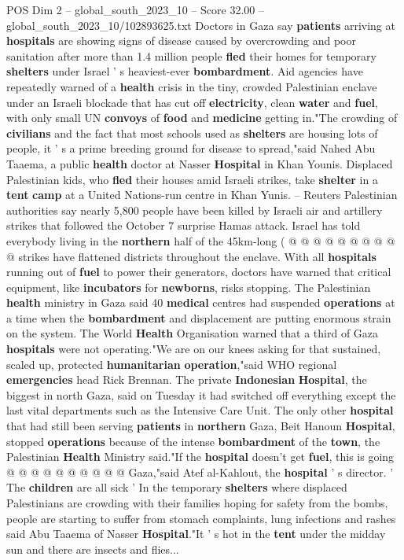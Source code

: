 \begin{textsample}{POS Dim 2 – global\_south\_2023\_10 – Score 32.00 – global\_south\_2023\_10/102893625.txt}  \label{ex:f2_pos_171}
Doctors in Gaza say \textbf{patients} arriving at \textbf{hospitals} are showing signs of disease caused by overcrowding and poor sanitation after more than 1.4 million people \textbf{fled} their homes for temporary \textbf{shelters} under Israel ' s heaviest-ever \textbf{bombardment}.
Aid agencies have repeatedly warned of a \textbf{health} crisis in the tiny, crowded Palestinian enclave under an Israeli blockade that has cut off \textbf{electricity}, clean \textbf{water} and \textbf{fuel}, with only small UN \textbf{convoys} of \textbf{food} and \textbf{medicine} getting in."The crowding of \textbf{civilians} and the fact that most schools used as \textbf{shelters} are housing lots of people, it ' s a prime breeding ground for disease to spread,"said Nahed Abu Taaema, a public \textbf{health} doctor at Nasser \textbf{Hospital} in Khan Younis.
Displaced Palestinian kids, who \textbf{fled} their houses amid Israeli strikes, take \textbf{shelter} in a \textbf{tent} \textbf{camp} at a United Nations-run centre in Khan Yunis. -- Reuters Palestinian authorities say nearly 5,800 people have been killed by Israeli air and artillery strikes that followed the October 7 surprise Hamas attack.
Israel has told everybody living in the \textbf{northern} half of the 45km-long ( @ @ @ @ @ @ @ @ @ @ strikes have flattened districts throughout the enclave.
With all \textbf{hospitals} running out of \textbf{fuel} to power their generators, doctors have warned that critical equipment, like \textbf{incubators} for \textbf{newborns}, risks stopping.
The Palestinian \textbf{health} ministry in Gaza said 40 \textbf{medical} centres had suspended \textbf{operations} at a time when the \textbf{bombardment} and displacement are putting enormous strain on the system.
The World \textbf{Health} Organisation warned that a third of Gaza \textbf{hospitals} were not operating."We are on our knees asking for that sustained, scaled up, protected \textbf{humanitarian} \textbf{operation},"said WHO regional \textbf{emergencies} head Rick Brennan.
The private \textbf{Indonesian} \textbf{Hospital}, the biggest in north Gaza, said on Tuesday it had switched off everything except the last vital departments such as the Intensive Care Unit.
The only other \textbf{hospital} that had still been serving \textbf{patients} in \textbf{northern} Gaza, Beit Hanoun \textbf{Hospital}, stopped \textbf{operations} because of the intense \textbf{bombardment} of the \textbf{town}, the Palestinian \textbf{Health} Ministry said."If the \textbf{hospital} doesn't get \textbf{fuel}, this is going @ @ @ @ @ @ @ @ @ @ Gaza,"said Atef al-Kahlout, the \textbf{hospital} ' s director. ' The \textbf{children} are all sick ' In the temporary \textbf{shelters} where displaced Palestinians are crowding with their families hoping for safety from the bombs, people are starting to suffer from stomach complaints, lung infections and rashes said Abu Taaema of Nasser \textbf{Hospital}."It ' s hot in the \textbf{tent} under the midday sun and there are insects and flies...

\end{textsample}
